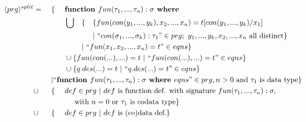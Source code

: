 \documentclass[11pt]{article} %
\begin{document}
\begin{alignat*}{5}
\langle prg \rangle^{split} & = ~&& \{ ~&& \textrm{\textbf{function }} fun(\tau_1, ..., \tau_n): \sigma \textrm{\textbf{ where }} \span\span\span\span \\
& && && \bigcup && \{ && \{ fun(con(y_1, ..., y_k), x_2, ..., x_n) = t[con(y_1, ..., y_k)/x_1] \\
& && && && && | ~ `` con(\sigma_1, ..., \sigma_k): \tau_1 " \in prg; ~ y_1, ..., y_k, x_2, ..., x_n \textrm{ all distinct} \} \\
& && && && | ~ `` fun(x_1, x_2, ..., x_n) = t " \in eqns \} \span\span \\
& && && \cup \{ fun(con(...), ...) = t ~ | ~ `` fun(con(...), ...) = t " \in eqns \} \span\span\span\span \\
& && && \cup \{ q.des(...) = t ~ | ~ `` q.des(...) = t " \in eqns \} \span\span\span\span \\
& && | `` \textrm{\textbf{function }} fun(\tau_1, ..., \tau_n): \sigma \textrm{\textbf{ where }} eqns " \in prg, n > 0 \textrm{ and } \tau_1 \textrm{ is data type} \} \span\span\span\span\span\span \\
& \cup && \{ && def \in prg ~ | ~ def \textrm{ is function def. with signature } fun(\tau_1, ..., \tau_n): \sigma, \span\span\span\span \\
& && &&\quad \textrm{ with } n = 0 \textrm{ or } \tau_1 \textrm{ is codata type} \} \span\span\span\span \\
& \cup && \{ && def \in prg ~ | ~ def \textrm{ is (co)data def.} \} \span\span\span\span
\end{alignat*}
\end{document}
